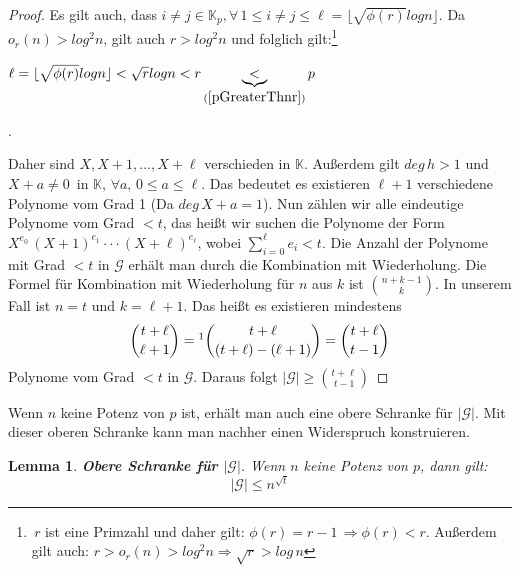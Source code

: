 \documentclass[12pt,oneside]{article}
\newtheorem{lemma}[theorem]{Lemma}
\theoremstyle{remark}
\theoremstyle{definition}
\begin{document}
\begin{proof}
Es gilt auch, dass $i \neq j  \in \mathbb{K}_p, \forall \, 1 \leq i \neq j \leq \ell = \lfloor \sqrt{\phi(r)} log n \rfloor$. Da $o_r(n) > log^2 n$, gilt auch $r > log^2 n$ und folglich gilt:\footnote{$\, r$ ist eine Primzahl und daher gilt: $\phi(r) = r - 1  \, \Rightarrow \phi(r) < r$. Außerdem gilt auch: $r > o_r(n) > log^2n \Rightarrow \sqrt{r} > log \, n $}\newline\newline
\centerline{$\ell = \lfloor \sqrt{\phi(r)} log n \rfloor < \sqrt{r} log  n < r \underbrace{<}_{(\ref{pGreaterThnr})} p$}.\newline

Daher sind $X, X + 1, ..., X + \ell$ verschieden in $\mathbb{K}$. Außerdem gilt $deg \, h > 1$ und $X + a \neq 0 \,$ in $\mathbb{K}, \, \forall a, \, 0 \leq a \leq \ell $. Das bedeutet es existieren $\ell + 1$ verschiedene Polynome vom Grad 1 (Da $deg \, X + a = 1$). Nun zählen wir alle eindeutige Polynome vom Grad $ < t$, das heißt wir suchen die Polynome der Form $X^{e_0} \, (X + 1)^{e_1} \cdot \cdot \cdot (X + \ell)^{e_\ell}$, wobei $\sum_{i = 0}^{\ell} e_i < t$. Die Anzahl der Polynome mit Grad $< t$ in $\mathcal{G}$ erhält man durch die Kombination mit Wiederholung. Die Formel für Kombination mit Wiederholung für $n$ aus  $k$ ist ${n + k - 1 \choose k}$. In unserem Fall ist $n = t $ und $k = \ell + 1$. Das heißt es existieren mindestens 
\begin{align*}
    {t + \ell  \choose \ell + 1} =\footnotemark {t + \ell \choose (t + \ell) - (\ell + 1)} = {t + \ell \choose t - 1}
\end{align*}
Polynome vom Grad $ < t $ in $\mathcal{G}$. Daraus folgt $| \mathcal{G}| \geq {t + \ell \choose t - 1} $ 
\end{proof}

Wenn $n$ keine Potenz von $p$ ist, erhält man auch eine obere Schranke für $|\mathcal{G}|$. Mit dieser oberen Schranke kann man nachher einen Widerspruch konstruieren. 

\begin{lemma}\label{closing_lemma}
\textbf{Obere Schranke für $|\mathcal{G}|$}.\newline
Wenn $n$ keine Potenz von $p$, dann gilt:
\begin{equation}
    |\mathcal{G}| \leq  n^{\sqrt{t}}
\end{equation}
\end{lemma}
\end{document}
